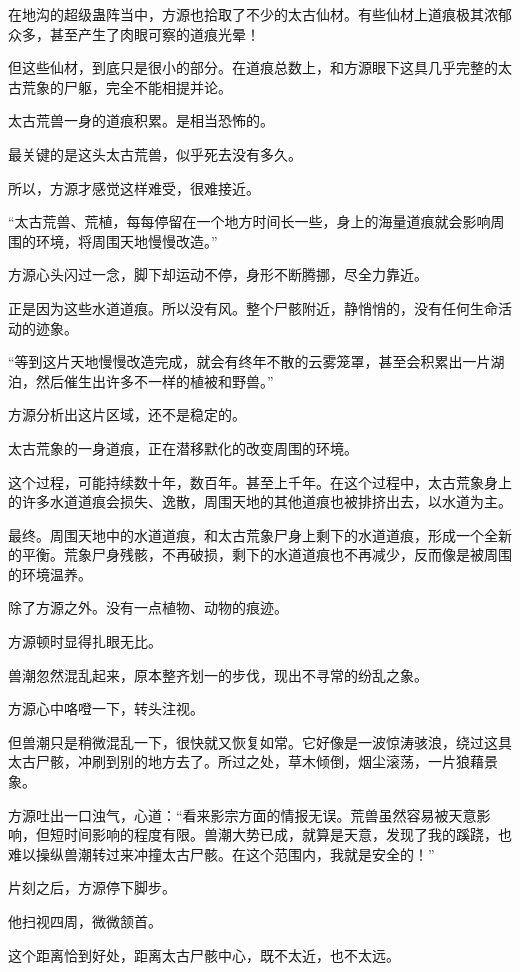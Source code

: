 \begin{this_body}
在地沟的超级蛊阵当中，方源也拾取了不少的太古仙材。有些仙材上道痕极其浓郁众多，甚至产生了肉眼可察的道痕光晕！

但这些仙材，到底只是很小的部分。在道痕总数上，和方源眼下这具几乎完整的太古荒象的尸躯，完全不能相提并论。

太古荒兽一身的道痕积累。是相当恐怖的。

最关键的是这头太古荒兽，似乎死去没有多久。

所以，方源才感觉这样难受，很难接近。

“太古荒兽、荒植，每每停留在一个地方时间长一些，身上的海量道痕就会影响周围的环境，将周围天地慢慢改造。”

方源心头闪过一念，脚下却运动不停，身形不断腾挪，尽全力靠近。

正是因为这些水道道痕。所以没有风。整个尸骸附近，静悄悄的，没有任何生命活动的迹象。

“等到这片天地慢慢改造完成，就会有终年不散的云雾笼罩，甚至会积累出一片湖泊，然后催生出许多不一样的植被和野兽。”

方源分析出这片区域，还不是稳定的。

太古荒象的一身道痕，正在潜移默化的改变周围的环境。

这个过程，可能持续数十年，数百年。甚至上千年。在这个过程中，太古荒象身上的许多水道道痕会损失、逸散，周围天地的其他道痕也被排挤出去，以水道为主。

最终。周围天地中的水道道痕，和太古荒象尸身上剩下的水道道痕，形成一个全新的平衡。荒象尸身残骸，不再破损，剩下的水道道痕也不再减少，反而像是被周围的环境温养。

除了方源之外。没有一点植物、动物的痕迹。

方源顿时显得扎眼无比。

兽潮忽然混乱起来，原本整齐划一的步伐，现出不寻常的纷乱之象。

方源心中咯噔一下，转头注视。

但兽潮只是稍微混乱一下，很快就又恢复如常。它好像是一波惊涛骇浪，绕过这具太古尸骸，冲刷到别的地方去了。所过之处，草木倾倒，烟尘滚荡，一片狼藉景象。

方源吐出一口浊气，心道：“看来影宗方面的情报无误。荒兽虽然容易被天意影响，但短时间影响的程度有限。兽潮大势已成，就算是天意，发现了我的蹊跷，也难以操纵兽潮转过来冲撞太古尸骸。在这个范围内，我就是安全的！”

片刻之后，方源停下脚步。

他扫视四周，微微颔首。

这个距离恰到好处，距离太古尸骸中心，既不太近，也不太远。


\end{this_body}
